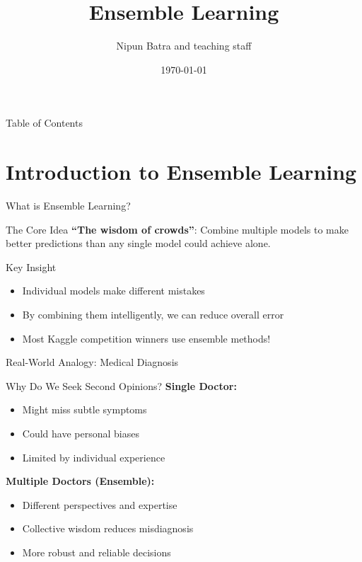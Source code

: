 \documentclass[10pt]{beamer}
\title{Ensemble Learning}
\date{\today}
\author{Nipun Batra and teaching staff}
\institute{IIT Gandhinagar}
\begin{document}
\maketitle

\begin{frame}{Table of Contents}
\tableofcontents
\end{frame}

\section{Introduction to Ensemble Learning}

\begin{frame}{What is Ensemble Learning?}
\begin{alertbox}{The Core Idea}
\textbf{``The wisdom of crowds''}: Combine multiple models to make better predictions than any single model could achieve alone.
\end{alertbox}

\begin{keypointsbox}{Key Insight}
\begin{itemize}
\item Individual models make different mistakes
\item By combining them intelligently, we can reduce overall error
\item Most Kaggle competition winners use ensemble methods!
\end{itemize}
\end{keypointsbox}
\end{frame}

\begin{frame}{Real-World Analogy: Medical Diagnosis}
\begin{examplebox}{Why Do We Seek Second Opinions?}
\textbf{Single Doctor:}
\begin{itemize}
\item Might miss subtle symptoms
\item Could have personal biases
\item Limited by individual experience
\end{itemize}

\textbf{Multiple Doctors (Ensemble):}
\begin{itemize}
\item Different perspectives and expertise
\item Collective wisdom reduces misdiagnosis
\item More robust and reliable decisions
\end{itemize}
\end{examplebox}
\end{frame}
\end{document}
